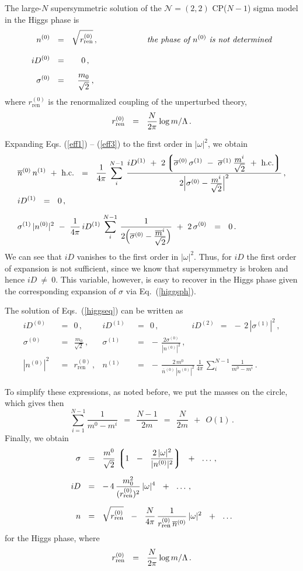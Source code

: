 \documentclass[epsfig,12pt]{article}
\newcommand{\ntwot}{${\mathcal N}= \left(2,2\right) $ }
\newcommand{\ov}{\overline}
\newcommand{\lgr}{\left\lgroup}
\newcommand{\rgr}{\right\rgroup}
\newcommand{\nz}{{n^{(0)}}}
\newcommand{\no}{{n^{(1)}}}
\newcommand{\bnz}{{\ov{n}{}^{(0)}}}
\newcommand{\Dz}{{D^{(0)}}}
\newcommand{\Do}{{D^{(1)}}}
\newcommand{\sigz}{{\sigma^{(0)}}}
\newcommand{\sigo}{{\sigma^{(1)}}}
\newcommand{\bsigz}{{\ov{\sigma}{}^{(0)}}}
\newcommand{\bsigo}{{\ov{\sigma}{}^{(1)}}}
\newcommand{\rrenz}{{r_\text{ren}^{(0)}}}
\begin{document}
{	The large-$N$ supersymmetric solution of the \ntwot CP($N-1$) sigma model
	in the Higgs phase is
\begin{align*}
%
	\nz & ~~=~~ \sqrt{\rrenz}\,,   \qquad\qquad\qquad\text{\it the phase of $\nz$ is not determined}\\[3mm]
%
	i\Dz & ~~=~~ ~~~\,0\,, \\[2mm]
%
	\sigz & ~~=~~ ~~\frac{m_0}{\sqrt{2}}\,,
\end{align*}
	where $ \rrenz $ is the renormalized coupling of the unperturbed theory,
\[
	\rrenz ~~=~~ \frac{N}{2\pi}\,{\rm log}\,m/\Lambda\,.
\]

Expanding Eqs. (\ref{eff1}) -- (\ref{eff3}) to the first order in $|\omega|^2$, we obtain
\begin{align}
%
\notag
	&
	\bnz\,\no ~+~ \text{h.c.} ~~=~~
	\frac{1}{4\pi}\, \sum_{i}^{N-1}\, 
		\frac{ i\Do ~+~ 2\lgr \bsigz\, \sigo ~-~ \bsigo\,\frac{\displaystyle m^i}{\displaystyle \sqrt{2}}
				~+~ \text{h.c.} \rgr }
			{ 2 \Bigl| \sigz - \frac{\displaystyle m^i}{\sqrt{\displaystyle 2}} \Bigr|^2 }\,, \\
%
\label{higgseq}
	&
	i\Do ~~=~~ 0\,, \\[2mm]
%
\notag
	&
	\sigo\,|\nz|^2  ~-~ 
	\frac{1}{4\pi}\,i\Do\, \sum_{i}^{N-1}\, \frac{1}
				{2\Bigl( \bsigz - \frac{\displaystyle \ov{m}{}^i}{\displaystyle \sqrt{2}} \Bigr) }
	~+~ 2\,\sigz ~~=~~ 0\,.
\end{align}
	We can see that $ iD $ vanishes to the first order in $ |\omega|^2 $.
	Thus, for $ iD $ the first order of expansion is not sufficient, since we know that supersymmetry
	is broken and hence $ iD ~\neq~ 0 $.
	This variable, however, is easy to recover in the Higgs phase given the corresponding expansion of $ \sigma $
	via Eq.~(\ref{higgsph}).

	The solution of Eqs.~(\ref{higgseq}) can be written as
\begin{align*}
%
	i \Dz & ~~=~~ 0\,,                     &       i\Do & ~~=~~ 0\,,  
			\qquad\qquad iD^{(2)} ~~=~~ -\,2\,|\sigo|^2\,, \\[3mm]
%
	\sigz & ~~=~~ \frac{m_0}{\sqrt{2}}\,,  &       \sigo & ~~=~~ -\,\frac{2\sigz}{|\nz|^2}\,, \\[3mm]
%
	|\nz|^2 & ~~=~~ \rrenz\,,              &    
			\no & ~~=~~ -\,\frac{2\,m^0}{\bnz\,|\nz|^2}\,\frac{1}{4\pi}\,
					\sum_{i}^{N-1} \frac{1}{m^0 - m^i}\,.
\end{align*}	

	To simplify these expressions, as noted before, we put the masses on the circle, which gives then
\[
	\sum_{i=1}^{N-1} \frac{1}{m^0 - m^i} ~~=~~ \frac{N-1}{2m} ~~=~~ \frac{N}{2m} ~~+~~ O(1)\,.
\]
	Finally, we obtain 
\begin{align*}
%
	\sigma & ~~=~~ \frac{m^0}{\sqrt{2}}\, \lgr 1 ~~-~~ \frac{2\,|\omega|^2}{|\nz|^2} \rgr ~~+~~ \ldots \,,
	\\[2mm]
%
	i D & ~~=~~ -\, 4\, \frac{m_0^2}{(\rrenz)^2}\, |\omega|^4 ~~+~~ \ldots\,,
	\\[2mm]
%
	n & ~~=~~ \sqrt{\rrenz} ~~-~~ \frac{N}{4\pi}\,\frac{1}{\rrenz\,\bnz}\,|\omega|^2 ~~+~~ \ldots
\end{align*}
	for the Higgs phase, where
\[
	\rrenz ~~=~~ \frac{N}{2\pi}\,{\rm log}\,m/\Lambda\,.
\]

}
\end{document}
